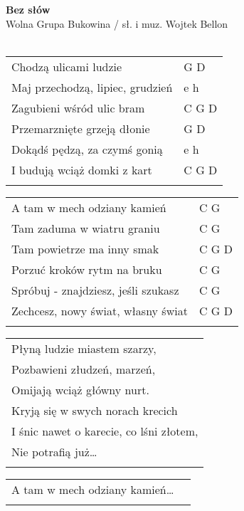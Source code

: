 \documentclass[a5paper]{article}
\begin{document}


\noindent
\fontsize{12pt}{15pt}\selectfont
\textbf{Bez słów} \\
\fontsize{8pt}{10pt}\selectfont
Wolna Grupa Bukowina / sł. i muz. Wojtek Bellon \\ \\
\fontsize{10pt}{12pt}\selectfont
{}
\begin{tabular}{@{}p{9cm}p{3cm}@{}}
\noindent
Chodzą ulicami ludzie & G D \\
Maj przechodzą, lipiec, grudzień & e h \\
Zagubieni wśród ulic bram & C G D \\
Przemarznięte grzeją dłonie & G D \\
Dokądś pędzą, za czymś gonią & e h \\
I budują wciąż domki z kart & C G D \\ \\
\end{tabular}

\noindent
\begin{tabular}{@{}p{8cm}p{3cm}@{}}
A tam w mech odziany kamień & C G \\
Tam zaduma w wiatru graniu & C G \\
Tam powietrze ma inny smak & C G D \\
Porzuć kroków rytm na bruku & C G \\
Spróbuj - znajdziesz, jeśli szukasz & C G \\
Zechcesz, nowy świat, własny świat & C G D \\ \\
\end{tabular}

\noindent
\begin{tabular}{@{}p{9.5cm}@{}}
Płyną ludzie miastem szarzy, \\
Pozbawieni złudzeń, marzeń, \\
Omijają wciąż główny nurt. \\
Kryją się w swych norach krecich \\
I śnic nawet o karecie, co lśni złotem, \\
Nie potrafią już… \\ \\
\end{tabular}

\noindent
\begin{tabular}{@{}p{8.5cm}p{3cm}@{}} 
A tam w mech odziany kamień… \\ \\
\end{tabular} 
\end{document}
